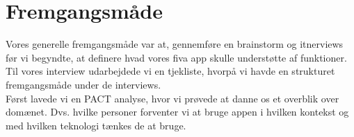 \documentclass[12pt]{article}
\begin{document}

\clearpage\maketitle
\thispagestyle{empty}

\newpage

\tableofcontents %

\thispagestyle{empty}

\newpage
\pagestyle{plain}
\setcounter{page}{1}

\section{Fremgangsmåde}
Vores generelle fremgangsmåde var at, gennemføre en brainstorm og itnerviews før vi begyndte, at definere hvad vores fiva app skulle understøtte af funktioner. Til vores interview udarbejdede vi en tjekliste, hvorpå vi havde en strukturet fremgangsmåde under de interviews.\\
Først lavede vi en PACT analyse, hvor vi prøvede at danne os et overblik over domænet. Dvs. hvilke personer forventer vi at bruge appen i hvilken kontekst og med hvilken teknologi tænkes de at bruge.\\
\end{document}
